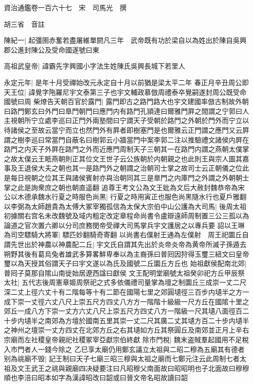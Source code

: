 資治通鑑卷一百六十七　宋　司馬光　撰

胡三省　音註

陳紀一|{
	起彊圉赤奮若盡屠維單閼凡三年　武帝既有功於梁自以為姓出於陳自吳興郡公進封陳公及受命國遂號曰東}


高祖武皇帝|{
	諱霸先字興國小字法生姓陳氏吳興長城下若里人}


永定元年|{
	是年十月受禪始改元永定自十月以前猶是梁太平二年}
春正月辛丑周公即天王位|{
	諱覺字陁羅尼宇文泰第三子也宇文輔政慕倣周禮泰卒覺嗣遂封周公既受命國號曰周}
柴燎告天朝百官於露門|{
	露門即古之路門路大也宇文建國率倣古制故外朝曰路門鄭玄曰外門曰臯門朝門曰應門内有路門孔頴達曰爾雅門屛之間謂之宁郭曰人主視朝所宁立處李巡曰正門外兩塾間曰宁謂天子受朝於路門之外朝於門外而宁立以待諸侯之至故云當宁而立也然門外有屛者即樹塞門是也爾雅云正門謂之應門又云屛謂之樹李巡曰常當門自蔽名曰樹郭云小牆當門中案李郭二注以推驗禮文諸侯内屛在路門之内天子外屛在路門之外而近應門周制天子三朝其一在路門内謂之燕朝太僕掌之故太僕云王眂燕朝則正其位文王世子云公族朝於内朝親之也此則王與宗人圖其嘉事及王退侯大夫之朝也其一是路門外之朝謂之治朝司士掌之故司士云正朝儀之位此是每日視朝之位其王與諸侯賓射亦與治朝同其三是臯門之内庫門之外謂之外朝朝士掌之此是詢衆庶之朝也朝直遥翻}
追尊王考文公為文王妣為文后大赦封魏恭帝為宋公以木德承魏水行夏之時服色尚黑|{
	行夏之時用寅正也服色尚黑隨水行也夏戶雅翻}
以李弼為太師趙貴為太傅大冢宰獨孤信為太保大宗伯中山公護為大司馬|{
	後周太祖初據關右宫名未改魏號及域内粗定改定章程命尚書令盧辯遠師周制置三公三孤以為論道之官次置六卿以分司庶務閔帝受禪大司馬掌兵宇文護居之以專兵要}
詔以王琳為司空驃騎大將軍|{
	驃匹妙翻騎奇寄翻}
以尚書右僕射王通為左僕射　周王祀圜丘自謂先世出於神農以神農配二丘|{
	宇文氏自謂其先出於炎帝炎帝為黄帝所滅子孫遁去朔野其後有葛烏兔者雄武多算畧鮮卑奉以為主裔孫曰普囘因狩得玉璽三紐文曰皇帝璽以為天授其俗謂天子曰宇文遂以為氏及國號二丘圜丘方丘也}
始祖獻侯配南北郊|{
	普囘子莫那自隂山南徙始居遼西諡曰獻侯}
文王配明堂廟號太祖癸卯祀方丘甲辰祭太社|{
	五代志後周憲章姬周祭祀之式多依儀禮司量掌為壇之制圜丘三成崇一丈二尺深二丈上徑六丈十有二階每等十有二節在國陽七里之郊圓壝徑三百步内壝半之方一成下崇一丈徑六丈八尺上崇五尺方四丈八方方一階階十級級一尺方丘在國隂十里之郊丘一成八方下崇一丈方六丈八尺上崇五尺方四丈八方一階級一尺其壝八面徑百二十步内壝半之南郊為方壇於國南五里其崇一丈二尺其廣二丈其壝方百二十步内壝半之神州之壇崇一丈方四丈在北郊方丘之右其壝如方丘其祭圓丘及南郊並正月上辛右宗廟而左社稷皇帝親祀社稷冢宰亞獻宗伯終獻}
除市門稅|{
	魏末盗賊羣起國用不足稅入市門者人一錢今除之}
乙巳享太廟仍用鄭玄議立太祖與二昭二穆為五廟其有德者别為祧廟不毁|{
	記王制曰天子七廟三昭三穆與太祖之廟而七鄭元注云此周制七者太祖及文王武王之祧與親廟四决疑要注曰凡昭穆父南面故曰昭昭明也子北面故曰穆穆順也李涪曰昭本如字為漢諱昭改曰韶或曰晉文帝名昭故讀曰韶}
